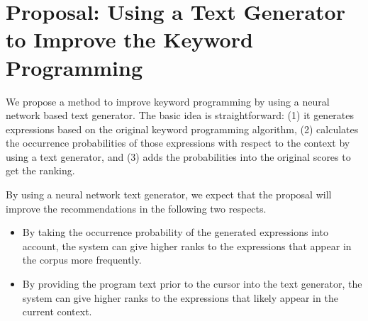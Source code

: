 \documentclass[PRO,english]{ipsj}
\begin{document}
\section{Proposal: Using a Text Generator to Improve the Keyword Programming}\label{sec:proposal}
We propose a method to improve keyword programming by using a neural network based text generator.  The basic idea is straightforward: (1) it generates expressions based on the original keyword programming algorithm, (2) calculates the occurrence probabilities of those expressions with respect to the context by using a text generator, and (3) adds the probabilities into the original scores to get the ranking.  

By using a neural network text generator, we expect that the proposal will improve the recommendations in the following two respects.
\begin{itemize}
\item By taking the occurrence probability of the generated expressions into account, the system can give higher ranks to the expressions that appear in the corpus more frequently.
\item By providing the program text prior to the cursor into the text generator, the system can give higher ranks to the expressions that likely appear in the current context.
\end{itemize}


\end{document}
